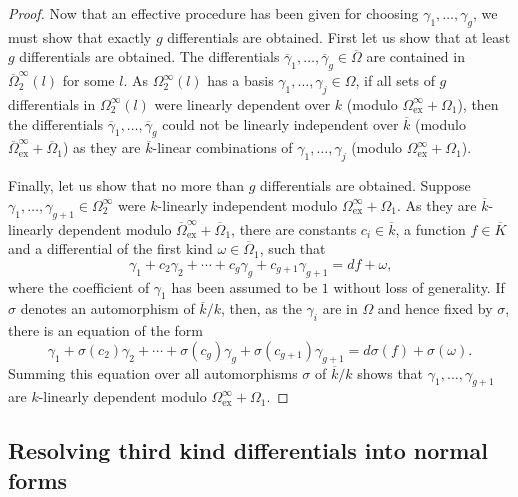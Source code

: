 \documentclass[12pt,reqno]{amsart}
\numberwithin{equation}{section}
\newcommand{\op}[1]  { \operatorname{ #1 }}
\begin{document}
\begin{proof}
Now that an effective procedure has been given for choosing $\gamma_1,\dots,\gamma_g$, we must show that exactly $g$ differentials are obtained. First let us show that at least $g$ differentials are obtained. The differentials $\overline{\gamma}_1,\dots,\overline{\gamma}_g \in \overline{\Omega}$ are contained in $\overline{\Omega}_{2}^{\infty}(l)$ for some $l$. As $\Omega_{2}^{\infty}(l)$ has a basis $\gamma_1,\dots,\gamma_j \in \Omega$, if all sets of $g$ differentials in $\Omega_{2}^{\infty}(l)$ were linearly dependent over $k$ (modulo $\Omega_{\op{ex}}^{\infty}+\Omega_1$), then the differentials $\overline{\gamma}_1,\dots,\overline{\gamma}_g$ could not be linearly independent over $\overline{k}$ (modulo $\overline{\Omega}_{\op{ex}}^{\infty}+\overline{\Omega}_1$) as they are $\overline{k}$-linear combinations of $\gamma_1,\dots,\gamma_j$ (modulo $\Omega_{\op{ex}}^{\infty}+\Omega_1$).

Finally, let us show that no more than $g$ differentials are obtained. Suppose $\gamma_1,\dots,\gamma_{g+1} \in \Omega_2^{\infty}$ were $k$-linearly independent modulo $\Omega_{\op{ex}}^{\infty}+\Omega_1$. As they are $\overline{k}$-linearly dependent modulo $\overline{\Omega}_{\op{ex}}^{\infty}+\overline{\Omega}_1$, there are constants $c_i \in \overline{k}$, a function $f \in \overline{K}$ and a differential of the first kind $\omega \in \overline{\Omega}_1$, such that
\begin{equation*}
\gamma_1 + c_2 \gamma_2 + \cdots + c_g \gamma_g +c_{g+1} \gamma_{g+1} = d f + \omega\text{,}
\end{equation*}
where the coefficient of $\gamma_1$ has been assumed to be $1$ without loss of generality. If $\sigma$ denotes an automorphism of $\overline{k}/k$, then, as the $\gamma_i$ are in $\Omega$ and hence fixed by $\sigma$, there is an equation of the form
\begin{equation*}
\gamma_1 + \sigma(c_2) \gamma_2 + \cdots + \sigma(c_g) \gamma_g + \sigma(c_{g+1}) \gamma_{g+1} = d \sigma(f) + \sigma(\omega)\text{.}
\end{equation*}
Summing this equation over all automorphisms $\sigma$ of $\overline{k}/k$ shows that $\gamma_1,\dots,\gamma_{g+1}$ are $k$-linearly dependent modulo $\Omega_{\op{ex}}^{\infty}+\Omega_1$.

\end{proof}



\subsection{Resolving third kind differentials into normal forms}
\end{document}
